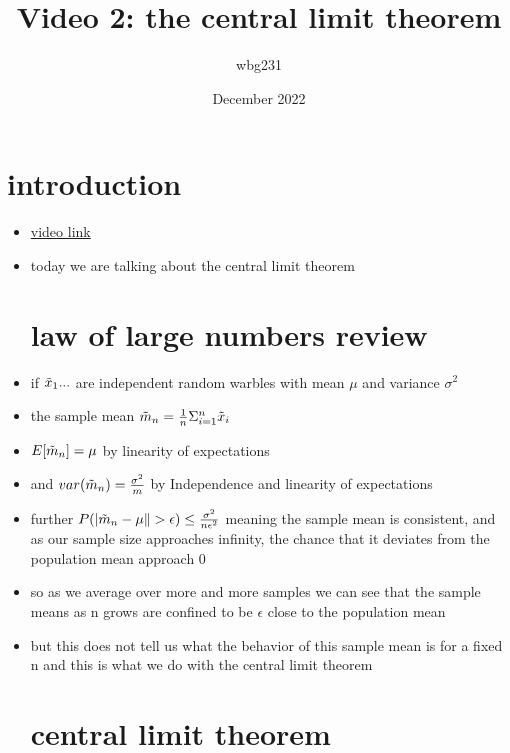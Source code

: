 \documentclass{article}
\title{Video 2: the central limit theorem}
\author{wbg231 }
\date{December 2022}
\begin{document}
\maketitle

\section{introduction}
\begin{itemize}
\item \href{https://www.youtube.com/watch?v=0z4rGGcvN2Y&list=PLBEf5mJtE6KuZ5NBQMuWIMsiOOrV9ibzm&index=71}{video link}
\item today we are talking about the central limit theorem 
\section{law of large numbers review}
\item if $\Tilde{x}_1...$ are independent  random warbles with mean $\mu$ and variance $\sigma^2$
\item the sample mean $\Tilde{m}_{n}=\frac{1}{n}\Sigma_{i=1}^{n}\Tilde{x}_i$
\item $E[\Tilde{m}_{n}]=\mu$ by linearity of expectations 
\item and $var(\Tilde{m}_n)=\frac{\sigma^2}{m}$ by Independence and linearity of expectations
\item further $P(|\Tilde{m}_{n} -\mu\|> \epsilon)\leq \frac{\sigma^2}{n\epsilon^2}$ meaning the sample mean is consistent, and as our sample size approaches infinity, the chance that it deviates from the population mean approach 0
\item so as we average over more and more samples we can see that the sample means as n grows are confined to be $\epsilon$ close to the population mean 
\item but this does not tell us what the behavior of this sample mean is for a fixed n and this is what we do with the central limit theorem 
\section{central limit theorem}

\end{itemize}
\end{document}
